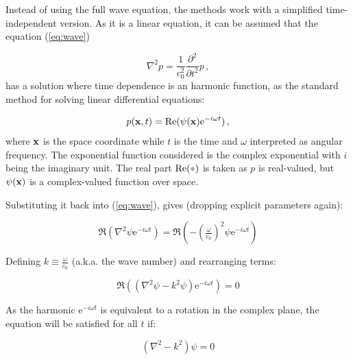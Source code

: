 
Instead of using the full wave equation, the methods work with a simplified
time-independent version. As it is a linear equation, it can be assumed that the
equation (\ref{eq:wave})

\[ \nabla^2 p = \frac{1}{c^2_0}\frac{\partial^2}{\partial t^2} p \,,\]
%
has a solution where time dependence is an harmonic function, as the standard
method for solving linear differential equations:

\begin{equation}
\label{eq:pressurepsi}
p(\mathrm{\mathbf{x}},t) = \operatorname{Re}(\psi(\mathrm{\mathbf{x}})\mathrm{e}^{-i\omega t})\,,
\end{equation}
%
where $\mathrm{\mathbf{x}}$ is the space coordinate while $t$ is the time and $\omega$
interpreted as angular frequency.
The exponential function considered is the complex exponential with $i$ being the imaginary unit.
The real part $\Re(\parm)$ is taken as $p$ is real-valued, but $\psi(\mathrm{\mathbf{x}})$
is a complex-valued function over space.

Substituting it back into (\ref{eq:wave}), gives
(dropping explicit parameters again):

\[ \Re(\nabla^2 \psi \mathrm{e}^{-i\omega t}) =
\Re(-(\tfrac{\omega}{c_0})^2 \psi \mathrm{e}^{-i\omega t})\]


Defining $k \equiv \tfrac{\omega}{c_0} $ (a.k.a. the wave number) and rearranging
terms:

\[ \Re((\nabla^2 \psi -k^2 \psi) \mathrm{e}^{-i\omega t}) = 0\]

As the harmonic $\mathrm{e}^{-i\omega t}$ is equivalent to a rotation in the
complex plane, the equation will be satisfied for all $t$ if:

\begin{equation}
\label{eq:helmholtz}
(\nabla^2 -k^2)\psi = 0 
\end{equation}

% 
% 
% 
% 
% 
% 

